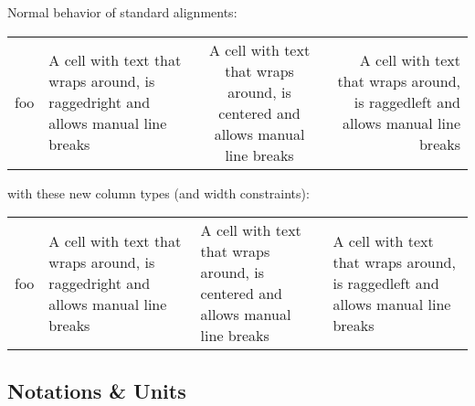 \noindent Normal behavior of standard alignments: \\

\begin{tabular}{|c|l|c|r|}
foo &
A cell with text that wraps around, is raggedright and allows \newline
    manual line breaks &
A cell with text that wraps around, is centered and allows \newline
    manual line breaks &
A cell with text that wraps around, is raggedleft and allows \newline
    manual line breaks \\
\end{tabular}

\noindent with these new column types (and width constraints): \\

\begin{tabular}{|c|L{3cm}|C{3cm}|R{0.3\textwidth}|}
foo &
A cell with text that wraps around, is raggedright and allows \newline
    manual line breaks &
A cell with text that wraps around, is centered and allows \newline
    manual line breaks &
A cell with text that wraps around, is raggedleft and allows \newline
    manual line breaks \\
\end{tabular}


\subsection{Notations \& Units}

